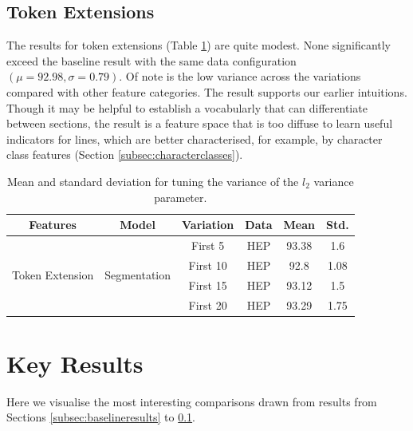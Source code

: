\subsection{Token Extensions}
\label{subsec:tokenextensionresults}

The results for token extensions (Table \ref{table:tokenextensions}) are quite modest. None significantly exceed the baseline result with the same data configuration $(\mu = 92.98, \sigma = 0.79)$. Of note is the low variance across the variations compared with other feature categories. The result supports our earlier intuitions. Though it may be helpful to establish a vocabularly that can differentiate between sections, the result is a feature space that is too diffuse to learn useful indicators for lines, which are better characterised, for example, by character class features (Section \ref{subsec:characterclasses}).

\begin{table}[h]
\begin{center}
\begin{tabular}{|c|c|c|c|c|c|}
\hline
Features & Model & Variation & Data & Mean & Std.\\
\hline
\multirow{4}{*}{Token Extension} & \multirow{4}{*}{Segmentation} & First 5 & HEP & 93.38 & 1.6\\\cline{3-6}
& & First 10 & HEP & 92.8 & 1.08\\\cline{3-6}
& & First 15 & HEP & 93.12 & 1.5\\\cline{3-6}
& & First 20 & HEP & 93.29 & 1.75\\\cline{3-6}
\hline
\end{tabular}
\caption[Mean and standard deviation for tuning the variance of the $l_2$ variance parameter.]{Mean and standard deviation for tuning the variance of the $l_2$ variance parameter.}
\label{table:tokenextensions}
\end{center}
\end{table}

\section{Key Results}

Here we visualise the most interesting comparisons drawn from results from Sections \ref{subsec:baselineresults} to \ref{subsec:tokenextensionresults}.

